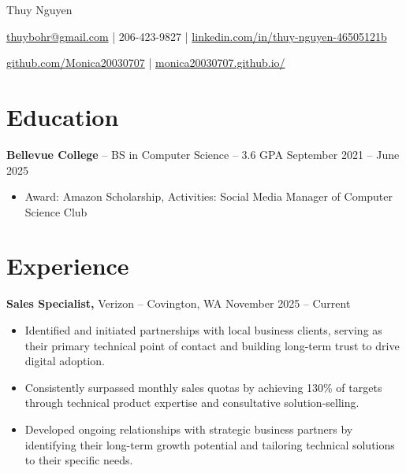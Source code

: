 \documentclass[11pt]{article}       %
\begin{document}
\centerline{\Huge Thuy Nguyen}

\vspace{5pt}

\centerline{\href{mailto:thuybohr@gmail.com}{thuybohr@gmail.com} | 206-423-9827 |
\href{https://www.linkedin.com/in/thuy-nguyen-46505121b/}{linkedin.com/in/thuy-nguyen-46505121b}}

\centerline{\href{https://github.com/Monica20030707}{github.com/Monica20030707} | 
\href{https://monica20030707.github.io/}{monica20030707.github.io/}} 

\vspace{-9pt}

\section*{Education}
\textbf{Bellevue College} -- BS in Computer Science -- 3.6 GPA \hfill September 2021 -- June 2025\\
\vspace{-9pt}
\begin{itemize}
  \item Award: Amazon Scholarship, Activities: Social Media Manager of Computer Science Club
\end{itemize}

\vspace{-18.5pt}

\section*{Experience}

\textbf{Sales Specialist,} {Verizon} -- Covington, WA \hfill November 2025 -- Current \\
\vspace{-9pt}
\begin{itemize}
  \item Identified and initiated partnerships with local business clients, serving as their primary technical point of contact and building long-term trust to drive digital adoption.
  \item Consistently surpassed monthly sales quotas by achieving 130\% of targets through technical product expertise and consultative solution-selling.
  \item Developed ongoing relationships with strategic business partners by identifying their long-term growth potential and tailoring technical solutions to their specific needs.
\end{itemize}
\end{document}
